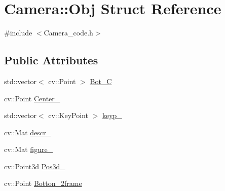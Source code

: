 \hypertarget{structCamera_1_1Obj}{\section{Camera\-:\-:Obj Struct Reference}
\label{structCamera_1_1Obj}
}


{\ttfamily \#include $<$Camera\-\_\-code.\-h$>$}

\subsection*{Public Attributes}
\begin{DoxyCompactItemize}
\item 
std\-::vector$<$ cv\-::\-Point $>$ \hyperlink{structCamera_1_1Obj_ab1c3c43239ea355d03dd2ee0f006e575}{Bot\-\_\-\-C}
\item 
cv\-::\-Point \hyperlink{structCamera_1_1Obj_a69bc5e8437942fb1b855ade6191e2e02}{Center\-\_\-}
\item 
std\-::vector$<$ cv\-::\-Key\-Point $>$ \hyperlink{structCamera_1_1Obj_a359b9e57e394fac56872d31568c337f7}{keyp\-\_\-}
\item 
cv\-::\-Mat \hyperlink{structCamera_1_1Obj_a25ec00d27e34c3fc7e59d31486780048}{descr\-\_\-}
\item 
cv\-::\-Mat \hyperlink{structCamera_1_1Obj_af99c481da3a55632756ffc33ef1e02bd}{figure\-\_\-}
\item 
cv\-::\-Point3d \hyperlink{structCamera_1_1Obj_a46467af56d41483ff11fd897935904bc}{Pos3d\-\_\-}
\item 
cv\-::\-Point \hyperlink{structCamera_1_1Obj_af8eb4d67cacbe337a083160f75ec8cf3}{Botton\-\_\-2frame}
\end{DoxyCompactItemize}


